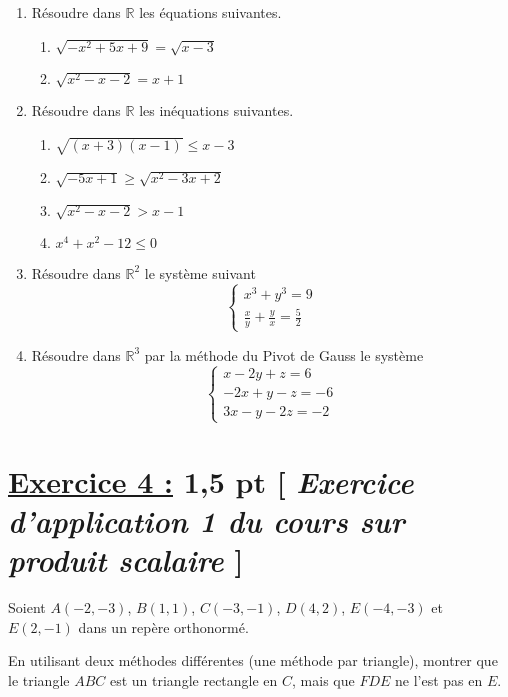 \documentclass[12pt,a4paper]{article}
\begin{document}
\begin{enumerate}
    \item Résoudre dans $\mathbb{R}$ les équations suivantes.
    \begin{enumerate}
        \item $\sqrt{-x^2 + 5x + 9} = \sqrt{x - 3}$
        \item $\sqrt{x^2 - x - 2} = x + 1$
    \end{enumerate}
    
    \item Résoudre dans $\mathbb{R}$ les inéquations suivantes.
    \begin{enumerate}
        \item $\sqrt{(x + 3)(x - 1)} \leq x - 3$
        \item $\sqrt{-5x + 1} \geq \sqrt{x^2 - 3x + 2}$
        \item $\sqrt{x^{2}-x-2} > x-1 $
        \item $x^4 + x^2 - 12 \leq 0$
    \end{enumerate}
    
    \item Résoudre dans $\mathbb{R}^2$ le système suivant
    \[
    \begin{cases}
        x^3 + y^3 = 9 \\
        \frac{x}{y} + \frac{y}{x} = \frac{5}{2}
    \end{cases}
    \]
    
    \item Résoudre dans $\mathbb{R}^3$ par la méthode du Pivot de Gauss le système
    \[
    \begin{cases}
        x - 2y + z = 6 \\
        -2x + y - z = -6 \\
        3x - y - 2z = -2
    \end{cases}
    \]
\end{enumerate}

\section*{\underline{Exercice 4 :} 1,5 pt [\textit{ Exercice d'application 1 du cours sur produit scalaire} ]} 
Soient $A(-2, -3)$, $B(1, 1)$, $C(-3, -1)$, $D(4, 2)$, $E(-4, -3)$ et $E(2, -1)$ dans un repère orthonormé.

En utilisant deux méthodes différentes (une méthode par triangle), montrer que le triangle $ABC$ est un triangle rectangle en $C$, mais que $FDE$ ne l'est pas en $E$.
\end{document}
